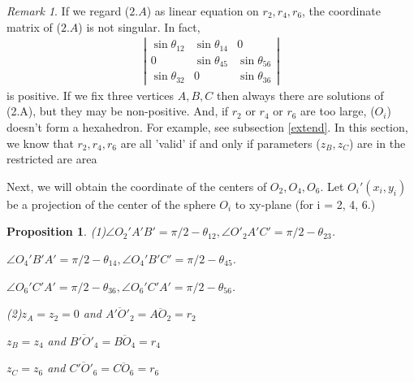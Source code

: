 \documentclass[dvipdfmx]{interact}
\theoremstyle{plain}%
\newtheorem{proposition}[theorem]{Proposition}
\theoremstyle{definition}
\theoremstyle{remark}
\newtheorem{remark}{Remark}
\theoremstyle{problemstyle}
\begin{document}
\begin{remark}
 If we regard ($2.A$) as linear equation on $r_2, r_4, r_6$, the
 coordinate matrix of ($2.A$) is not singular. In fact,
 \begin{eqnarray*}
  \left| 
   \begin{array}{ccc}
    \sin\theta_{12} & \sin\theta_{14} & 0\\
    0               & \sin\theta_{45} & \sin\theta_{56}\\
    \sin\theta_{32} & 0               & \sin\theta_{36}
   \end{array}
  \right|
 \end{eqnarray*}
 is positive.
 If we fix three vertices $A, B, C$ then always there are solutions of
 (2.A), but they may be non-positive. And, if $r_2$ or $r_4$ or $r_6$
 are too large, ($O_i$) doesn't form a hexahedron. For example, see
 subsection \ref{extend}. In this section, we know that $r_2, r_4, r_6$ are all
 'valid' if and only if parameters ($z_B, z_C$) are in the restricted are
 area

Next, we will obtain the coordinate of the centers of $O_2, O_4, O_6$.
Let $O_i'(x_i, y_i)$ be a projection of the center of the sphere $O_i$
 to xy-plane (for i = 2, 4, 6.)
\end{remark}

\begin{proposition}\label{angles}
 (1)$\angle O_2'A'B' = \pi/2 - \theta_{12}, \angle
 O'_2A'C'=\pi/2-\theta_{23}$.

  $\angle O_4'B'A' = \pi/2 - \theta_{14}, \angle O_4'B'C' = \pi/2 -
 \theta_{45}$.

 $\angle O_6'C'A' = \pi/2 - \theta_{36}, \angle O_6'C'A' = \pi/2 - \theta_{56}$.

 (2)$z_A = z_2 = 0$ and $\overline{A'O'_2} = \overline{AO_2} = r_2$

 $z_B = z_4$ and $\overline{B'O'_4} = \overline{BO_4} = r_4$

 $z_C = z_6$ and $\overline{C'O'_6} = \overline{CO_6} = r_6$
\end{proposition}
\end{document}
